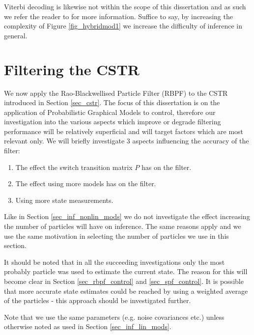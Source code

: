 Viterbi decoding is likewise not within the scope of this dissertation and as such we refer the reader to \cite{murphy1} for more information. Suffice to say, by increasing the complexity of Figure \ref{fig_hybridmod1} we increase the difficulty of inference in general.

\section{Filtering the CSTR}
We now apply the Rao-Blackwellised Particle Filter (RBPF) to the CSTR introduced in Section \ref{sec_cstr}. The focus of this dissertation is on the application of Probabilistic Graphical Models to control, therefore our investigation into the various aspects which improve or degrade filtering performance will be relatively superficial and will target factors which are most relevant only. We will briefly investigate 3 aspects influencing the accuracy of the filter:
\begin{enumerate}
\item
The effect the switch transition matrix $P$ has on the filter.
\item
The effect using more models has on the filter.
\item
Using more state measurements.
\end{enumerate}
Like in Section \ref{sec_inf_nonlin_mods} we do not investigate the effect increasing the number of particles will have on inference. The same reasons apply and we use the same motivation in selecting the number of particles we use in this section.

It should be noted that in all the succeeding investigations only the most probably particle was used to estimate the current state. The reason for this will become clear in Section \ref{sec_rbpf_control} and \ref{sec_spf_control}. It is possible that more accurate state estimates could be reached by using a weighted average of the particles - this approach should be investigated further.

Note that we use the same parameters (e.g. noise covariances etc.) unless otherwise noted as used in Section \ref{sec_inf_lin_mods}.

